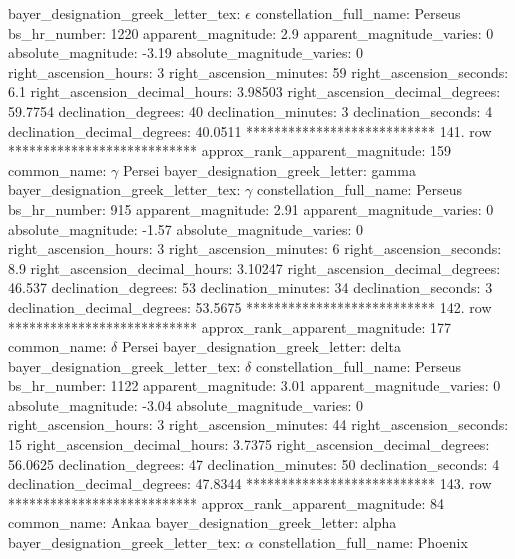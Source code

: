 bayer_designation_greek_letter_tex: $\epsilon$
           constellation_full_name: Perseus
                      bs_hr_number: 1220
                apparent_magnitude: 2.9
         apparent_magnitude_varies: 0
                absolute_magnitude: -3.19
         absolute_magnitude_varies: 0
             right_ascension_hours: 3
           right_ascension_minutes: 59
           right_ascension_seconds: 6.1
     right_ascension_decimal_hours: 3.98503
   right_ascension_decimal_degrees: 59.7754
               declination_degrees: 40
               declination_minutes: 3
               declination_seconds: 4
       declination_decimal_degrees: 40.0511
*************************** 141. row ***************************
    approx_rank_apparent_magnitude: 159
                       common_name: $\gamma$ Persei
    bayer_designation_greek_letter: gamma
bayer_designation_greek_letter_tex: $\gamma$
           constellation_full_name: Perseus
                      bs_hr_number: 915
                apparent_magnitude: 2.91
         apparent_magnitude_varies: 0
                absolute_magnitude: -1.57
         absolute_magnitude_varies: 0
             right_ascension_hours: 3
           right_ascension_minutes: 6
           right_ascension_seconds: 8.9
     right_ascension_decimal_hours: 3.10247
   right_ascension_decimal_degrees: 46.537
               declination_degrees: 53
               declination_minutes: 34
               declination_seconds: 3
       declination_decimal_degrees: 53.5675
*************************** 142. row ***************************
    approx_rank_apparent_magnitude: 177
                       common_name: $\delta$ Persei
    bayer_designation_greek_letter: delta
bayer_designation_greek_letter_tex: $\delta$
           constellation_full_name: Perseus
                      bs_hr_number: 1122
                apparent_magnitude: 3.01
         apparent_magnitude_varies: 0
                absolute_magnitude: -3.04
         absolute_magnitude_varies: 0
             right_ascension_hours: 3
           right_ascension_minutes: 44
           right_ascension_seconds: 15
     right_ascension_decimal_hours: 3.7375
   right_ascension_decimal_degrees: 56.0625
               declination_degrees: 47
               declination_minutes: 50
               declination_seconds: 4
       declination_decimal_degrees: 47.8344
*************************** 143. row ***************************
    approx_rank_apparent_magnitude: 84
                       common_name: Ankaa
    bayer_designation_greek_letter: alpha
bayer_designation_greek_letter_tex: $\alpha$
           constellation_full_name: Phoenix
